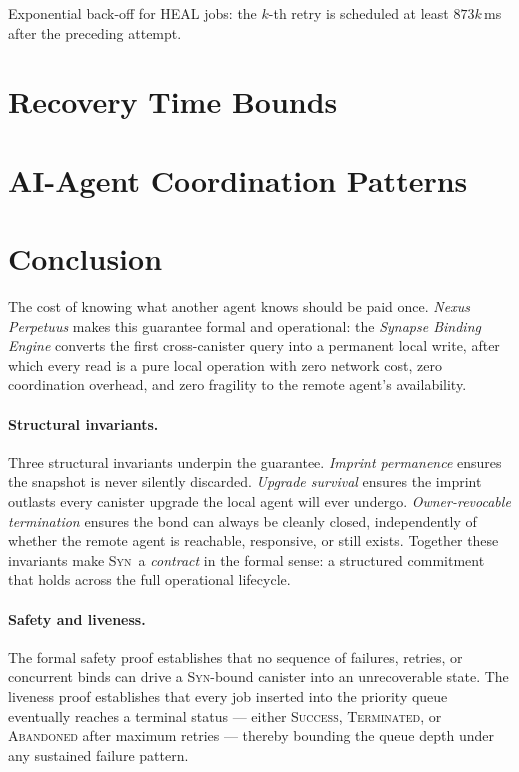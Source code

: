 \documentclass[11pt,a4paper]{article}
\newcommand{\SYN}{\textsc{Syn}}
\begin{document}
Exponential back-off for HEAL jobs: the $k$-th retry is scheduled at least
$873k$\,ms after the preceding attempt.

\section{Recovery Time Bounds}
\label{sec:recovery}


\section{AI-Agent Coordination Patterns}
\label{sec:coordination}


\section{Conclusion}
\label{sec:conclusion}

The cost of knowing what another agent knows should be paid once.
\emph{Nexus Perpetuus} makes this guarantee formal and operational: the
\emph{Synapse Binding Engine} converts the first cross-canister query into a
permanent local write, after which every read is a pure local operation with
zero network cost, zero coordination overhead, and zero fragility to the remote
agent's availability.

\paragraph{Structural invariants.}
Three structural invariants underpin the guarantee.  \emph{Imprint permanence}
ensures the snapshot is never silently discarded.  \emph{Upgrade survival}
ensures the imprint outlasts every canister upgrade the local agent will ever
undergo.  \emph{Owner-revocable termination} ensures the bond can always be
cleanly closed, independently of whether the remote agent is reachable,
responsive, or still exists.  Together these invariants make \SYN\ a
\emph{contract} in the formal sense: a structured commitment that holds across
the full operational lifecycle.

\paragraph{Safety and liveness.}
The formal safety proof establishes that no sequence of failures, retries, or
concurrent binds can drive a \SYN-bound canister into an unrecoverable state.
The liveness proof establishes that every job inserted into the priority queue
eventually reaches a terminal status --- either \textsc{Success},
\textsc{Terminated}, or \textsc{Abandoned} after maximum retries --- thereby
bounding the queue depth under any sustained failure pattern.
\end{document}
